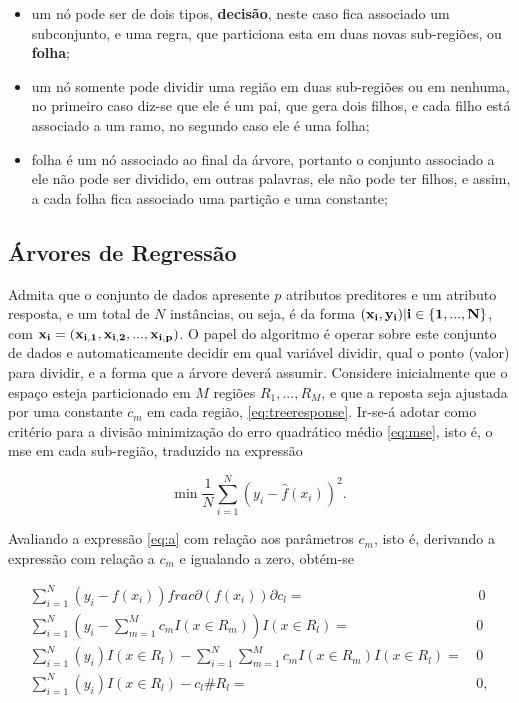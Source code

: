 \begin{itemize}
\item um nó pode ser de dois tipos, {\bf decisão}, neste caso fica associado um subconjunto, e uma regra, que particiona esta em duas novas sub-regiões, ou {\bf folha};
\item um nó somente pode dividir uma região em duas sub-regiões ou em nenhuma, no primeiro caso diz-se que ele é um pai, que gera dois filhos, e cada filho está associado a um ramo, no segundo caso ele é uma folha;
\item folha é um nó associado ao final da árvore, portanto o conjunto associado a ele não pode ser dividido, em outras palavras, ele não pode ter filhos, e assim, a cada folha fica associado uma partição e uma constante;
\end{itemize}


\subsection{Árvores de Regressão}

Admita que o conjunto de dados apresente $p$ atributos preditores e um atributo resposta, e um total de $N$ instâncias, ou seja, é da forma $(\bf{x}_i,y_i)|i\in\{1,...,N\}$, com $\bf{x}_i=(x_{i,1}, x_{i,2}, ..., x_{i,p})$. O papel do algoritmo é operar sobre este conjunto de dados e automaticamente decidir em qual variável dividir, qual o ponto (valor) para dividir, e a forma que a árvore deverá assumir. Considere inicialmente que o espaço esteja particionado em $M$ regiões $R_1,...,R_M$, e que a reposta seja ajustada por uma constante $c_m$ em cada região, \eqref{eq:treeresponse}. Ir-se-á adotar como critério para a divisão minimização do erro quadrático médio \eqref{eq:mse}, isto é, o mse em cada sub-região, traduzido na expressão

\begin{equation}\label{eq:a}
\min\frac{1}{N}\sum_{i=1}^N(y_i-\hat{f}(x_i))^2\mbox{.}~
\end{equation}

Avaliando a expressão \eqref{eq:a} com relação aos parâmetros $c_m$, isto é, derivando a expressão com relação a $c_m$ e igualando a zero, obtém-se

\begin{align}
\sum_{i=1}^N(y_i-f(x_i))frac{\partial(f(x_i))}{\partial{c_l}}=&\,0 \nonumber \\
\sum_{i=1}^N(y_i-\sum_{m=1}^Mc_mI(x\in{R_m}))I(x\in{R_l})=\,&0 \nonumber \\
\sum_{i=1}^N(y_i)I(x\in{R_l}) - \sum_{i=1}^N\sum_{m=1}^Mc_mI(x\in{R_m})I(x\in{R_l})=\,&0 \nonumber\\
\sum_{i=1}^N(y_i)I(x\in{R_l}) - c_l \#R_l=\,&0\mbox{,}~
\end{align}

